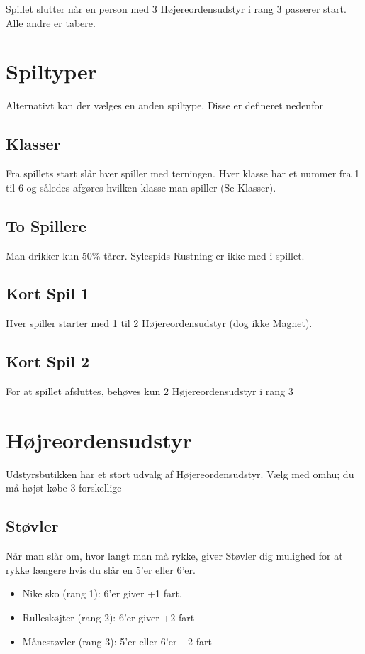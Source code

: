 \documentclass{article}
\begin{document}
 Spillet slutter når en person med 3 Højereordensudstyr i rang 3 passerer start. Alle andre er tabere. 

\section{Spiltyper}
 
  Alternativt kan der vælges en anden spiltype. Disse er defineret nedenfor
 
\subsection{Klasser}
Fra spillets start slår hver spiller med terningen. Hver klasse har et nummer fra 1 til 6 og således afgøres hvilken klasse man spiller (Se Klasser).
 
\subsection{To Spillere}
Man drikker kun 50\% tårer.
Sylespids Rustning er ikke med i spillet.
  
\subsection{Kort Spil 1}
Hver spiller starter med 1 til 2 Højereordensudstyr (dog ikke Magnet).

\subsection{Kort Spil 2}
For at spillet afsluttes, behøves kun 2 Højereordensudstyr i rang 3

\pagebreak

\section{Højreordensudstyr}
Udstyrsbutikken har et stort udvalg af Højereordensudstyr. Vælg med omhu; du må højst købe 3  forskellige
 
\subsection{Støvler}
Når man slår om, hvor langt man må rykke, giver Støvler dig mulighed for at rykke længere hvis du slår en 5’er eller 6’er.

\begin{itemize}
	\item Nike sko (rang 1): 6'er giver +1 fart.
	\item Rulleskøjter (rang 2): 6'er giver +2 fart
	\item Månestøvler (rang 3): 5'er eller 6'er +2 fart
\end{itemize}
 
\end{document}
